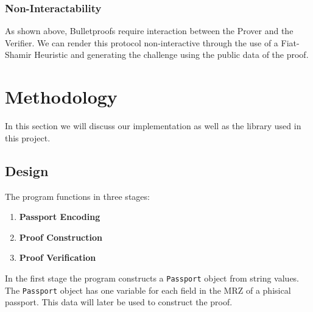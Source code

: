 \documentclass[sigconf,screen,nonacm]{acmart}
\begin{document}
  \subsubsection{Non-Interactability}

  As shown above, Bulletproofs require interaction between the Prover and the
  Verifier. We can render this protocol non-interactive through the use of a
  Fiat-Shamir Heuristic and generating the challenge using the public data of the
  proof.

  \section{Methodology}

  In this section we will discuss our implementation as well as the library used in
  this project.

  \subsection{Design}

  The program functions in three stages:
  \begin{enumerate}
    \item \textbf{Passport Encoding}
    \item \textbf{Proof Construction}
    \item \textbf{Proof Verification}
  \end{enumerate}

  In the first stage the program constructs a \texttt{Passport} object from
  string values. The \texttt{Passport} object has one variable for each field
  in the MRZ of a phisical passport. This data will later be used to construct the
  proof.
\end{document}
